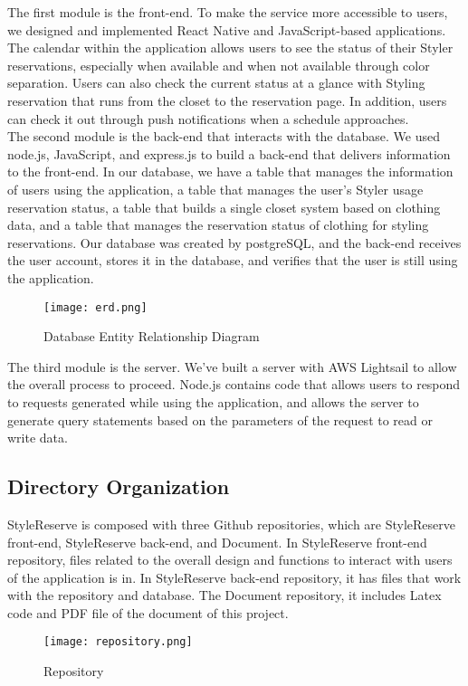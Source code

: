 \documentclass[conference]{IEEEtran}
\begin{document}
The first module is the front-end. To make the service more accessible to users, we designed and implemented React Native and JavaScript-based applications. The calendar within the application allows users to see the status of their Styler reservations, especially when available and when not available through color separation. Users can also check the current status at a glance with Styling reservation that runs from the closet to the reservation page. In addition, users can check it out through push notifications when a schedule approaches.\\
The second module is the back-end that interacts with the database. We used node.js, JavaScript, and express.js to build a back-end that delivers information to the front-end. In our database, we have a table that manages the information of users using the application, a table that manages the user's Styler usage reservation status, a table that builds a single closet system based on clothing data, and a table that manages the reservation status of clothing for styling reservations. Our database was created by postgreSQL, and the back-end receives the user account, stores it in the database, and verifies that the user is still using the application.\\

\begin{figure}[htbp]
\centerline{\texttt{[image: erd.png]}}
\label{fig}
\caption{Database Entity Relationship Diagram}
\end{figure}
The third module is the server. We've built a server with AWS Lightsail to allow the overall process to proceed. Node.js contains code that allows users to respond to requests generated while using the application, and allows the server to generate query statements based on the parameters of the request to read or write data.\\

\subsection{Directory Organization}
StyleReserve is composed with three Github repositories, which are StyleReserve front-end, StyleReserve back-end, and Document. In StyleReserve front-end repository, files related to the overall design and functions to interact with users of the application is in.
In StyleReserve back-end repository, it has files that work with the repository and database.
The Document repository, it includes Latex code and PDF file of the document of this project.\\
\begin{figure}[htbp]
\centerline{\texttt{[image: repository.png]}}
\label{fig}
\caption{Repository}
\end{figure}
\end{document}
